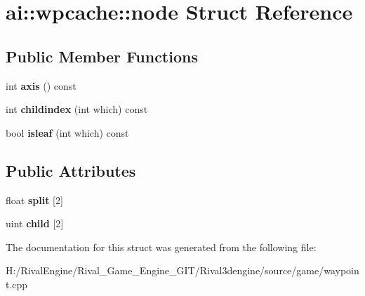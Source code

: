 \hypertarget{structai_1_1wpcache_1_1node}{}\section{ai\+:\+:wpcache\+:\+:node Struct Reference}
\label{structai_1_1wpcache_1_1node}
\subsection*{Public Member Functions}
\begin{DoxyCompactItemize}
\item 
\mbox{\label{structai_1_1wpcache_1_1node_a6dc7e23a6bb4f34d9d50d1464a245e31}} 
int {\bfseries axis} () const
\item 
\mbox{\label{structai_1_1wpcache_1_1node_a5b65fd67d8043990cb9147c148cbb169}} 
int {\bfseries childindex} (int which) const
\item 
\mbox{\label{structai_1_1wpcache_1_1node_ae0d4bcc5ec2ac1ca282229c3cb4de209}} 
bool {\bfseries isleaf} (int which) const
\end{DoxyCompactItemize}
\subsection*{Public Attributes}
\begin{DoxyCompactItemize}
\item 
\mbox{\label{structai_1_1wpcache_1_1node_ac35f50dcdc8043746f0258886a3e0b4b}} 
float {\bfseries split} \mbox{[}2\mbox{]}
\item 
\mbox{\label{structai_1_1wpcache_1_1node_a08f205a98d30293efedc6af82f96738a}} 
uint {\bfseries child} \mbox{[}2\mbox{]}
\end{DoxyCompactItemize}


The documentation for this struct was generated from the following file\+:\begin{DoxyCompactItemize}
\item 
H\+:/\+Rival\+Engine/\+Rival\+\_\+\+Game\+\_\+\+Engine\+\_\+\+G\+I\+T/\+Rival3dengine/source/game/waypoint.\+cpp\end{DoxyCompactItemize}
